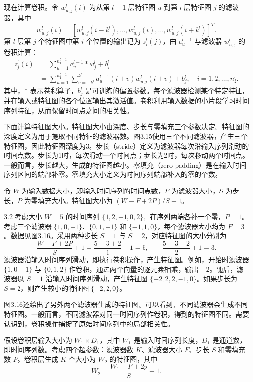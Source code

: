 现在计算卷积。令 $w_{u,j}^l(i)$ 为从第 $l-1$ 层特征图 $u$ 到第 $l$ 层特征图 $j$ 的滤波器，其中
\[
w_{u,j}^l(i)=
[w_{u,j}^l(i-k^l),\ldots,w_{u,j}^l(i),\ldots,w_{u,j}^l(i+k^l)]^T.
\]
第 $l$ 层第 $j$ 个特征图中第 $i$ 个位置的输出记为 $z_i^l(j)$，由 $a_u^{l-1}$ 与滤波器 $w_{u,j}^l$ 的卷积计算：
\begin{equation}
\begin{aligned}
z_j^l(i)
&=\sum_{u=1}^{n_1^{l-1}}a_u^{l-1}*w_j^l+b_j^l\\
&=\sum_{u=1}^{n_1^{l-1}}\sum_{v=-k^l}^{k^l}
a_u^{l-1}(i+v)w_{u,j}^l(i+v)+b_j^l,
\quad i=1,2,\ldots,n_2^l.
\end{aligned}
\tag{3.22}
\end{equation}
其中，$*$ 表示卷积算子，$b_j^l$ 是可训练的偏置参数。每个滤波器检测某个特定特征，并在输入或特征图的各个位置输出其激活值。卷积利用输入数据的小片段学习时间序列特征，从而保留时间点之间的相关性。

下面计算特征图大小。特征图大小由深度、步长与零填充三个参数决定。特征图的深度定义为用于提取不同特征的滤波器数。图3.15使用三个不同滤波器，产生三个特征图，因此特征图深度为3。步长（stride）定义为滤波器每次沿输入序列滑动的时间点数。步长为1时，每次滑动一个时间点；步长为2时，每次移动两个时间点。一般而言，步长越大，生成的特征图越小。零填充（zero-padding）是在输入时间序列区间的端部补零。零填充大小定义为时间序列端部补入的零的个数。

令 $W$ 为输入数据大小，即输入时间序列的时间点数，$F$ 为滤波器大小，$S$ 为步长，$P$ 为零填充大小。特征图大小为
$ (W-F+2P)/S+1$。

\begin{bookexample}{3.2}
考虑大小 $W=5$ 的时间序列 $\{1,2,-1,0,2\}$，在序列两端各补一个零，$P=1$。考虑三个滤波器 $\{1,0,-1\}$、$\{0,1,-1\}$ 和 $\{-1,1,0\}$，每个滤波器大小均为 $F=3$。数据见图3.16。采用两种步长 $S=1$ 与 $S=2$，对应特征图的大小分别为
\[
\frac{W-F+2P}{S}+1=\frac{5-3+2}{1}+1=5,
\qquad
\frac{5-3+2}{2}+1=3.
\]
滤波器沿输入时间序列滑动，即执行卷积操作，产生特征图。例如，开始时滤波器 $\{1,0,-1\}$ 与 $\{0,1,2\}$ 作卷积，通过两个向量的逐元素相乘，输出 $-2$。随后，滤波器以 $S=1$ 沿输入时间序列滑动，产生特征图 $\{-2,2,2,-1,0\}$。如果步长为 $S=2$，则产生较小的特征图 $\{-2,2,0\}$。

图3.16还绘出了另外两个滤波器生成的特征图。可以看到，不同滤波器会生成不同特征图。一般而言，不同滤波器对同一时间序列作卷积，得到的特征图不同。需要认识到，卷积操作捕捉了原始时间序列中的局部相关性。

假设卷积层输入大小为 $W_1\times D_1$，其中 $W_1$ 是输入时间序列长度，$D_1$ 是通道数，即时间序列数。考虑四个超参数：滤波器数 $K$、滤波器大小 $F$、步长 $S$ 和零填充数 $P$。卷积层生成 $K$ 个大小为 $W_2$ 的特征图，其中
\[
W_2=\frac{W_1-F+2p}{S}+1.
\]
\end{bookexample}

